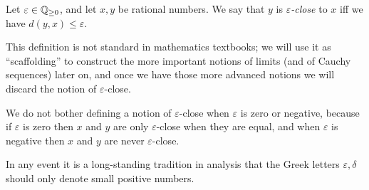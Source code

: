 \begin{defn}\label{i:4.3.4}
  Let \(\varepsilon \in \mathbb{Q}_{\geq 0}\), and let \(x, y\) be rational numbers.
  We say that \(y\) is \emph{\(\varepsilon\)-close} to \(x\) iff we have \(d(y, x) \leq \varepsilon\).
\end{defn}

\begin{rmk}\label{i:4.3.5}
  This definition is not standard in mathematics textbooks;
  we will use it as ``scaffolding'' to construct the more important notions of limits (and of Cauchy sequences) later on, and once we have those more advanced notions we will discard the notion of \(\varepsilon\)-close.
\end{rmk}

\begin{note}
  We do not bother defining a notion of \(\varepsilon\)-close when \(\varepsilon\) is zero or negative, because if \(\varepsilon\) is zero then \(x\) and \(y\) are only \(\varepsilon\)-close when they are equal, and when \(\varepsilon\) is negative then \(x\) and \(y\) are never \(\varepsilon\)-close.
\end{note}

\begin{note}
  In any event it is a long-standing tradition in analysis that the Greek letters \(\varepsilon, \delta\) should only denote small positive numbers.
\end{note}

